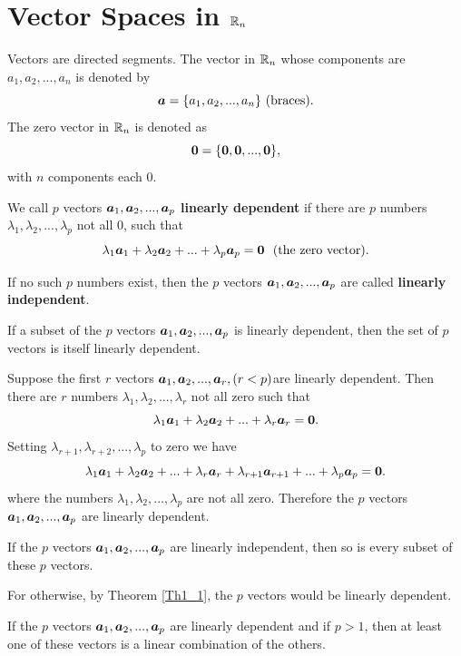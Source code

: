 \section{Vector Spaces in $\mathbb{R}_n$}

\begin{definition}
Vectors are directed segments. The vector in $\mathbb{R}_n$ whose components are $a_1, a_2,...,a_n$ is denoted by $$\boldsymbol{a} = \{a_1, a_2, ..., a_n\}\hbox{~(braces)}.$$
The zero vector in $\mathbb{R}_n$ is denoted as $$\bf 0 = \{0,0,...,0\},$$ with $n$ components each 0. 
\end{definition}

\begin{definition}We call $p$ vectors $\boldsymbol{a}_1, \boldsymbol{a}_2, ..., \boldsymbol{a}_p$ {\bf linearly dependent} if there are $p$ numbers $\lambda_1, \lambda_2,...,\lambda_p$ not all $0$, such that 
$$\lambda_1 \boldsymbol{a}_1 + \lambda_2 \boldsymbol{a}_2 +...+ \lambda_p \boldsymbol{a}_p = \bf 0\hbox{~ (the zero vector)}.$$
\end{definition}

If no such $p$ numbers exist, then the $p$ vectors $\boldsymbol{a}_1, \boldsymbol{a}_2, ...,\boldsymbol{a}_p$ are called {\bf linearly independent}.

\begin{theorem} 
If a subset of the $p$ vectors $\boldsymbol{a}_1, \boldsymbol{a}_2,...,\boldsymbol{a}_p$ is linearly dependent, then the set of $p$ vectors is itself linearly dependent.\label{Th1_1}
\end{theorem}

Suppose the first $r$ vectors $\boldsymbol{a}_1, \boldsymbol{a}_2, ..., \boldsymbol{a}_r, (r < p) $are linearly dependent. Then there are $r$ numbers $\lambda_1, \lambda_2, ..., \lambda_r$ not all zero such that 
$$\lambda_1 \boldsymbol{a}_1 + \lambda_2 \boldsymbol{a}_2 + ... + \lambda_r \boldsymbol{a}_r = \bf 0.$$ Setting $\lambda_{r+1}, \lambda_{r+2}, ..., \lambda_p$ to zero we have
$$\lambda_1 \boldsymbol{a}_1 + \lambda_2 \boldsymbol{a}_2 + ... + \lambda_r \boldsymbol{a}_r + \lambda_{r+1}\boldsymbol{a}_{r+1} +... + \lambda_p \boldsymbol{a}_p = \bf 0.$$ where the numbers $\lambda_1, \lambda_2, ..., \lambda_p$ are not all zero. Therefore the 
$p$ vectors $\boldsymbol{a}_1, \boldsymbol{a}_2, ..., \boldsymbol{a}_p$ are linearly dependent. 

\begin{theorem}
If the $p$ vectors $\boldsymbol{a}_1, \boldsymbol{a}_2, ..., \boldsymbol{a}_p$ are linearly independent, then so is every subset of these $p$ vectors. \label{Th1_2}
\end{theorem}

For otherwise, by Theorem \ref{Th1_1}, the $p$ vectors would be linearly dependent.

\begin{theorem}
If the $p$ vectors $\boldsymbol{a}_1, \boldsymbol{a}_2, ..., \boldsymbol{a}_p$ are linearly dependent and if $p>1$, then at least one of these vectors
is a linear combination of the others.\label{Th1_3}
\end{theorem}

